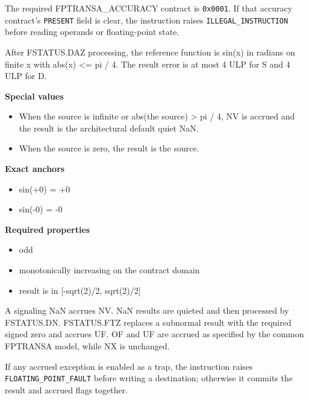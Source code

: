 The required FPTRANSA\_ACCURACY contract is \texttt{0x0001}. If that accuracy contract's \texttt{PRESENT} field is clear, the instruction raises \texttt{ILLEGAL\_INSTRUCTION} before reading operands or floating-point state.

After FSTATUS.DAZ processing, the reference function is sin(x) in radians on finite x with abs(x) \textless{}= pi / 4. The result error is at most 4 ULP for S and 4 ULP for D.

\textbf{Special values}\par
\begin{itemize}
\item When the source is infinite or abs(the source) \textgreater{} pi / 4, NV is accrued and the result is the architectural default quiet NaN.
\item When the source is zero, the result is the source.
\end{itemize}

\textbf{Exact anchors}\par
\begin{itemize}
\item sin(+0) = +0
\item sin(-0) = -0
\end{itemize}

\textbf{Required properties}\par
\begin{itemize}
\item odd
\item monotonically increasing on the contract domain
\item result is in [-sqrt(2)/2, sqrt(2)/2]
\end{itemize}

A signaling NaN accrues NV. NaN results are quieted and then processed by FSTATUS.DN. FSTATUS.FTZ replaces a subnormal result with the required signed zero and accrues UF. OF and UF are accrued as specified by the common FPTRANSA model, while NX is unchanged.

If any accrued exception is enabled as a trap, the instruction raises \texttt{FLOATING\_POINT\_FAULT} before writing a destination; otherwise it commits the result and accrued flags together.
